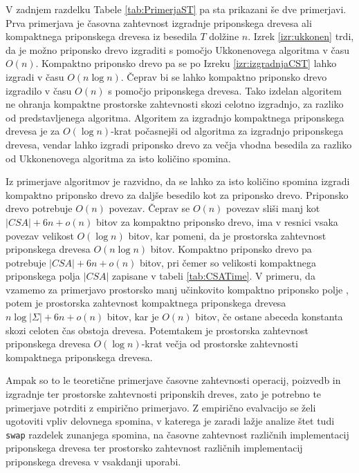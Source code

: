 V zadnjem razdelku Tabele \ref{tab:PrimerjaST} pa sta prikazani še dve primerjavi. Prva primerjava je časovna zahtevnost izgradnje priponskega drevesa ali kompaktnega priponskega drevesa iz besedila $T$ dolžine $n$. Izrek \ref{izr:ukkonen} trdi, da je možno priponsko drevo izgraditi s pomočjo Ukkonenovega algoritma v času $O(n)$. Kompaktno priponsko drevo pa se po Izreku \ref{izr:izgradnjaCST} lahko izgradi v času $O(n\log{n})$. Čeprav bi se lahko kompaktno priponsko drevo izgradilo v času $O(n)$ s pomočjo priponskega drevesa. Tako izdelan algoritem ne ohranja kompaktne prostorske zahtevnosti skozi celotno izgradnjo, za razliko od predstavljenega algoritma. Algoritem za izgradnjo kompaktnega priponskega drevesa je za $O(\log{n})$-krat počasnejši od algoritma za izgradnjo priponskega drevesa, vendar lahko izgradi priponsko drevo za večja vhodna besedila za razliko od Ukkonenovega algoritma za isto količino spomina.

Iz primerjave algoritmov je razvidno, da se lahko za isto količino spomina izgradi kompaktno priponsko drevo za daljše besedilo kot za priponsko drevo. Priponsko drevo potrebuje $O(n)$ povezav. Čeprav se $O(n)$ povezav sliši manj kot $|CSA|+6n+o(n)$ bitov za kompaktno priponsko drevo, ima v resnici vsaka povezav velikost $O(\log{n})$ bitov, kar pomeni, da je prostorska zahtevnost priponskega drevesa $O(n\log{n})$ bitov. Kompaktno priponsko drevo pa potrebuje $|CSA|+6n+o(n)$ bitov, pri čemer so velikosti kompaktnega priponskega polja $|CSA|$ zapisane v tabeli \ref{tab:CSATime}. V primeru, da vzamemo za primerjavo prostorsko manj učinkovito kompaktno priponsko polje \cite{Grossi2000}, potem je prostorska zahtevnost kompaktnega priponskega drevesa $n\log|\Sigma|+6n+o(n)$ bitov, kar je $O(n)$ bitov, če ostane abeceda konstanta skozi celoten čas obstoja drevesa. Potemtakem je prostorska zahtevnost priponskega drevesa $O(\log{n})$-krat večja od prostorske zahtevnosti kompaktnega priponskega drevesa.

Ampak so to le teoretične primerjave časovne zahtevnosti operacij, poizvedb in izgradnje ter prostorske zahtevnosti priponskih dreves, zato je potrebno te primerjave potrditi z empirično primerjavo. Z empirično evalvacijo se želi ugotoviti vpliv delovnega spomina, v katerega je zaradi lažje analize štet tudi \texttt{swap} razdelek zunanjega spomina, na časovne zahtevnost različnih implementacij priponskega drevesa ter prostorsko zahtevnost različnih implementacij priponskega drevesa v vsakdanji uporabi.

